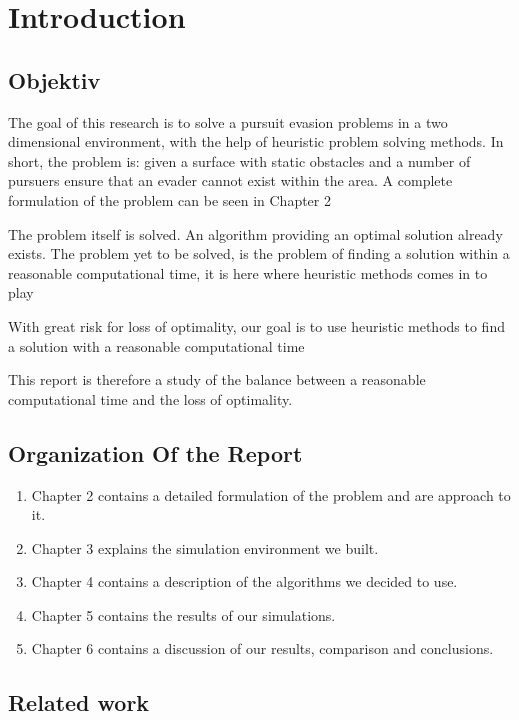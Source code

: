 \chapter{Introduction}

\section{Objektiv}

The goal of this research is to solve a pursuit evasion problems in a two dimensional environment, with the help of heuristic problem solving methods.
In short, the problem is: given a surface with static obstacles and a number of pursuers ensure that an evader cannot exist within the area. A complete formulation of the problem can be seen in Chapter 2

The problem itself is solved. An algorithm providing an optimal solution already exists.
The problem yet to be solved, is the problem of finding a solution within a reasonable computational time, it is here where heuristic methods comes in to play

With great risk for loss of optimality, our goal is to use heuristic methods to find a solution with a reasonable computational time
 
This report is therefore a study of the balance between a reasonable computational time and the loss of optimality.

\section{Organization Of the Report}
\begin{enumerate}
\item Chapter 2 contains a detailed formulation of the problem and are approach to it.
\item Chapter 3 explains the simulation environment we built.
\item Chapter 4 contains a description of the algorithms we decided to use.
\item Chapter 5 contains the results of our simulations.
\item Chapter 6 contains a discussion of our results, comparison and conclusions.
\end{enumerate}

\section{ Related work}

